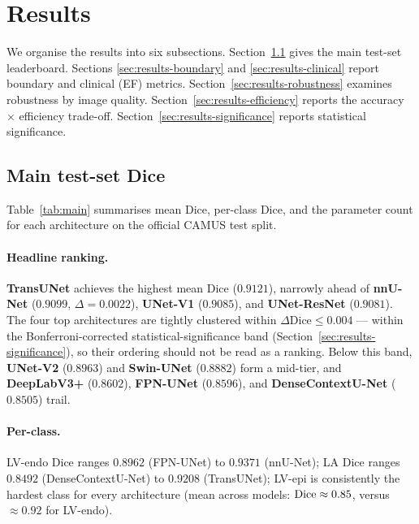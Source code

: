 \section{Results}
\label{sec:results}

We organise the results into six subsections. Section~\ref{sec:results-main}
gives the main test-set leaderboard. Sections \ref{sec:results-boundary}
and \ref{sec:results-clinical} report boundary and clinical
(EF) metrics. Section~\ref{sec:results-robustness} examines robustness by
image quality. Section~\ref{sec:results-efficiency} reports the accuracy
$\times$ efficiency trade-off. Section~\ref{sec:results-significance}
reports statistical significance.

\subsection{Main test-set Dice}
\label{sec:results-main}

Table~\ref{tab:main} summarises mean Dice, per-class Dice, and the
parameter count for each architecture on the official CAMUS test split.



\paragraph{Headline ranking.}
\textbf{TransUNet} achieves the highest mean Dice ($0.9121$), narrowly
ahead of \textbf{nnU-Net} ($0.9099$, $\Delta = 0.0022$), \textbf{UNet-V1}
($0.9085$), and \textbf{UNet-ResNet} ($0.9081$). The four top architectures
are tightly clustered within $\Delta\text{Dice} \le 0.004$ ---
within the Bonferroni-corrected statistical-significance band
(Section~\ref{sec:results-significance}), so their ordering should not be
read as a ranking. Below this band,
\textbf{UNet-V2} ($0.8963$) and \textbf{Swin-UNet} ($0.8882$) form a
mid-tier, and \textbf{DeepLabV3+} ($0.8602$), \textbf{FPN-UNet}
($0.8596$), and \textbf{DenseContextU-Net} ($0.8505$) trail.

\paragraph{Per-class.}
LV-endo Dice ranges $0.8962$ (FPN-UNet) to $0.9371$ (nnU-Net);
LA Dice ranges $0.8492$ (DenseContextU-Net) to $0.9208$ (TransUNet);
LV-epi is consistently the hardest class for every architecture (mean
across models: $\operatorname{Dice} \approx 0.85$, versus $\approx 0.92$ for LV-endo).

